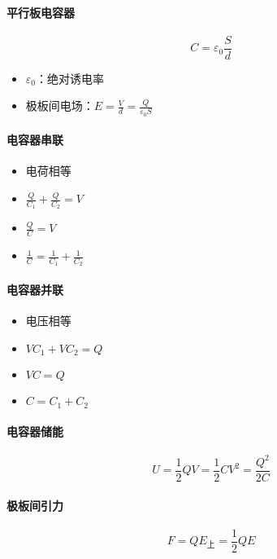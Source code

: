 \paragraph{平行板电容器}
\begin{equation*}
    C=\varepsilon_0\frac{S}{d}
\end{equation*}
\begin{itemize}
    \item $\varepsilon_0$：绝对诱电率
    \item 极板间电场：$E=\frac{V}{d}=\frac{Q}{\varepsilon_0S}$
\end{itemize}

\paragraph{电容器串联}
\begin{itemize}
    \item 电荷相等
    \item $\frac{Q}{C_1}+\frac{Q}{C_2}=V$
    \item $\frac{Q}{C}=V$
    \item $\frac{1}{C}=\frac{1}{C_1}+\frac{1}{C_2}$
\end{itemize}

\paragraph{电容器并联}
\begin{itemize}
    \item 电压相等
    \item $VC_1+VC_2=Q$
    \item $VC=Q$
    \item $C=C_1+C_2$
\end{itemize}

\paragraph{电容器储能}
\begin{equation*}
    U=\frac12QV=\frac12CV^2=\frac{Q^2}{2C}
\end{equation*}

\paragraph{极板间引力}
\begin{equation*}
    F=QE_\textrm{上}=\frac12QE
\end{equation*}

